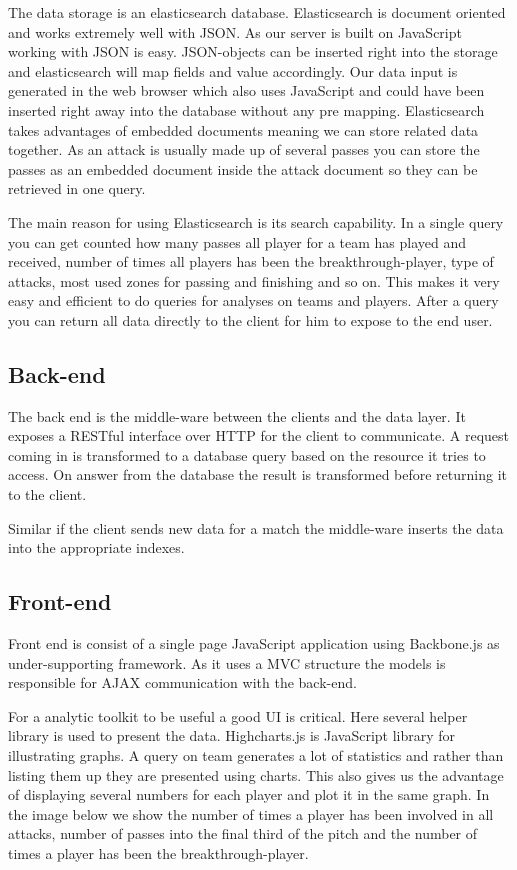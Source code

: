 The data storage is an elasticsearch database. Elasticsearch is document oriented and works extremely well with JSON. As our server is built on JavaScript working with JSON is easy. JSON-objects can be inserted right into the storage and elasticsearch will map fields and value accordingly.  Our data input is generated in the web browser which also uses JavaScript and could have been inserted right away into the database without any pre mapping.
Elasticsearch takes advantages of embedded documents meaning we can store related data together. As an attack is usually made up of several passes you can store the passes as an embedded document inside the attack document so they can be retrieved in one query. 

The main reason for using Elasticsearch is its search capability. In a single query you can get counted how many passes all player for a team has played and received, number of times all players has been the breakthrough-player, type of attacks, most used zones for passing and finishing and so on. This makes it very easy and efficient to do queries for analyses on teams and players. After a query you can return all data directly to the client for him to expose to the end user.

\subsection{Back-end}

The back end is the middle-ware between the clients and the data layer. It exposes a RESTful interface over HTTP for the client to communicate. A request coming in is transformed to a database query based on the resource it tries to access. On answer from the database the result is transformed before returning it to the client. 

Similar if the client sends new data for a match the middle-ware inserts the data into the appropriate indexes.


\subsection{Front-end}

Front end is consist of a single page JavaScript application using Backbone.js as under-supporting framework. As it uses a MVC structure the models is responsible for AJAX communication with the back-end. 

For a analytic toolkit to be useful a good UI is critical. Here several helper library is used to present the data. Highcharts.js is JavaScript library for illustrating graphs. A query on team generates a lot of statistics and rather than listing them up they are presented using charts. This also gives us the advantage of displaying several numbers for each player and plot it in the same graph. In the image below we show the number of times a player has been involved in all attacks, number of passes into the final third of the pitch and the number of times a player has been the breakthrough-player.

